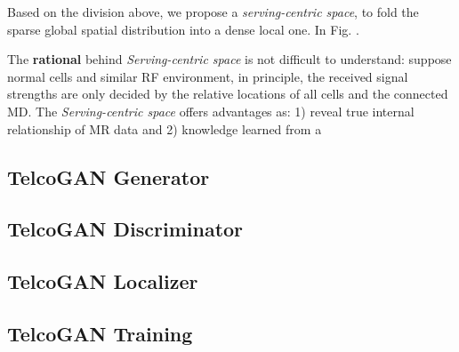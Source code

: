 Based on the division above, we propose a \emph{serving-centric space}, to fold the sparse global spatial distribution into a dense local one. In Fig. .

The \textbf{rational} behind \emph{Serving-centric space} is not difficult to understand: suppose normal cells and similar RF environment, in principle, the received signal strengths are only decided by the relative locations of all cells and the connected MD. The \emph{Serving-centric space} offers advantages as: 1) reveal true internal relationship of MR data and 2) knowledge learned from a 

\subsection{TelcoGAN Generator}

\subsection{TelcoGAN Discriminator}

\subsection{TelcoGAN Localizer}

\subsection{TelcoGAN Training}

